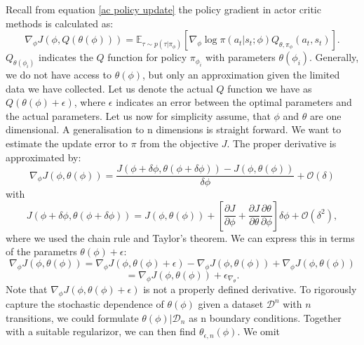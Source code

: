 Recall from equation \ref{ac policy update} the policy gradient in actor critic methods is calculated as:
\begin{equation}
    \nabla_{\phi} J(\phi, Q(\theta(\phi))) = \mathbb{E}_{\tau \sim p(\tau | \pi_{\phi})} \left[\nabla_{\phi} \log \pi(a_t|s_t;\phi) Q_{\theta, \pi_\phi}(a_t, s_t) \right].
\end{equation}
$Q_{\theta(\phi_i)}$ indicates the $Q$ function for policy $\pi_{\phi_{i}}$ with parameters 
$\theta(\phi_i)$. 
Generally, we do not have access to $\theta(\phi)$, but only an approximation given the limited data we have collected. Let us denote the actual 
$Q$ function we have as $Q(\theta(\phi) + \epsilon)$, where $\epsilon$ indicates an error between the optimal parameters and the actual parameters.
Let us now for simplicity assume, that $\phi$ and $\theta$ are one dimensional. A generalisation to n dimensions is straight forward. We want 
to estimate the update error to $\pi$ from the objective $J$. The proper derivative is approximated by:
\begin{equation}
    \nabla_{\phi} J(\phi, \theta(\phi)) = \frac{J(\phi + \delta \phi, \theta(\phi + \delta \phi)) - J(\phi, \theta(\phi))}{\delta \phi} + \mathcal{O}(\delta)
\end{equation}
with 
\begin{equation}
    J(\phi + \delta \phi, \theta(\phi + \delta \phi)) = J(\phi, \theta(\phi)) + \left[ 
        \frac{\partial J}{\partial \phi} + \frac{\partial J}{\partial \theta} \frac{\partial \theta}{\partial \phi}
    \right] \delta \phi  + \mathcal{O}(\delta^2),
\end{equation}
where we used the chain rule and Taylor's theorem. 
We can express this in terms of the parametrs $\theta(\phi) + \epsilon$:
\begin{equation}
    \nabla_{\phi} J(\phi, \theta(\phi)) = \nabla_{\phi} J(\phi, \theta(\phi) + \epsilon) - \nabla_{\phi} J(\phi, \theta(\phi)) + \nabla_{\phi} J(\phi, \theta(\phi))
\end{equation}
\begin{equation*}
    = \nabla_{\phi} J(\phi, \theta(\phi)) + \epsilon_{\nabla_{\theta}}.
\end{equation*}
Note that $\nabla_{\phi} J(\phi, \theta(\phi) + \epsilon)$ is not a properly defined derivative. To rigorously capture the stochastic dependence of $\theta(\phi)$ 
given a dataset $\mathcal{D}^n$ with $n$ transitions, 
we could formulate $\theta(\phi)|\mathcal{D}_n$ as n boundary conditions. Together with a suitable regularizor, we can then find $\theta_{\epsilon, n}(\phi)$. We omit 

